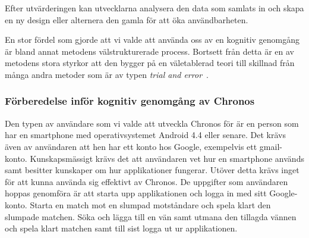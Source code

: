 \documentclass[a4paper, 11pt]{article}
\begin{document}
Efter utvärderingen kan utvecklarna analysera den data som samlats in och skapa en ny design eller alternera den gamla för att öka användbarheten.


En stor fördel som gjorde att vi valde att använda oss av en kognitiv genomgång är bland annat metodens välstrukturerade process. Bortsett från detta är en av metodens stora styrkor att den bygger på en väletablerad teori till skillnad från många andra metoder som är av typen \textit{trial and error}~\cite[sid 230-231]{benyon2010designing}.


\subsubsection{Förberedelse inför kognitiv genomgång av Chronos} \label{kog}
Den typen av användare som vi valde att utveckla Chronos för är en person som har en smartphone med operativsystemet Android 4.4 eller senare. Det krävs även av användaren att hen har ett konto hos Google, exempelvis ett gmail-konto. Kunskapsmässigt krävs det att användaren vet hur en smartphone används samt besitter kunskaper om hur applikationer fungerar. Utöver detta krävs inget för att kunna använda sig effektivt av Chronos.
De uppgifter som användaren hoppas genomföra är att starta upp applikationen och logga in med sitt Google-konto. Starta en match mot en slumpad motståndare och spela klart den slumpade matchen. Söka och lägga till en vän samt utmana den tillagda vännen och spela klart matchen samt till sist logga ut ur applikationen.
\end{document}
